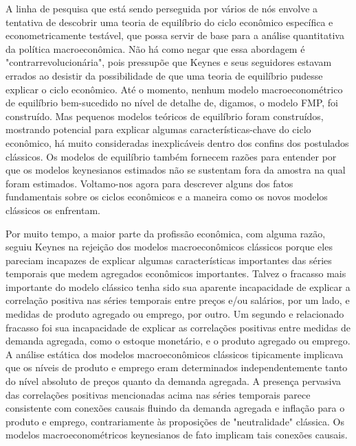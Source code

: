 \documentclass[12pt]{article}
\begin{document}
A linha de pesquisa que está sendo perseguida por vários de nós envolve a tentativa de descobrir uma teoria de equilíbrio do ciclo econômico específica e econometricamente testável, que possa servir de base para a análise quantitativa da política macroeconômica. Não há como negar que essa abordagem é "contrarrevolucionária", pois pressupõe que Keynes e seus seguidores estavam errados ao desistir da possibilidade de que uma teoria de equilíbrio pudesse explicar o ciclo econômico. Até o momento, nenhum modelo macroeconométrico de equilíbrio bem-sucedido no nível de detalhe de, digamos, o modelo FMP, foi construído. Mas pequenos modelos teóricos de equilíbrio foram construídos, mostrando potencial para explicar algumas características-chave do ciclo econômico, há muito consideradas inexplicáveis dentro dos confins dos postulados clássicos. Os modelos de equilíbrio também fornecem razões para entender por que os modelos keynesianos estimados não se sustentam fora da amostra na qual foram estimados. Voltamo-nos agora para descrever alguns dos fatos fundamentais sobre os ciclos econômicos e a maneira como os novos modelos clássicos os enfrentam.

Por muito tempo, a maior parte da profissão econômica, com alguma razão, seguiu Keynes na rejeição dos modelos macroeconômicos clássicos porque eles pareciam incapazes de explicar algumas características importantes das séries temporais que medem agregados econômicos importantes. Talvez o fracasso mais importante do modelo clássico tenha sido sua aparente incapacidade de explicar a correlação positiva nas séries temporais entre preços e/ou salários, por um lado, e medidas de produto agregado ou emprego, por outro. Um segundo e relacionado fracasso foi sua incapacidade de explicar as correlações positivas entre medidas de demanda agregada, como o estoque monetário, e o produto agregado ou emprego. A análise estática dos modelos macroeconômicos clássicos tipicamente implicava que os níveis de produto e emprego eram determinados independentemente tanto do nível absoluto de preços quanto da demanda agregada. A presença pervasiva das correlações positivas mencionadas acima nas séries temporais parece consistente com conexões causais fluindo da demanda agregada e inflação para o produto e emprego, contrariamente às proposições de "neutralidade" clássica. Os modelos macroeconométricos keynesianos de fato implicam tais conexões causais.
\end{document}
